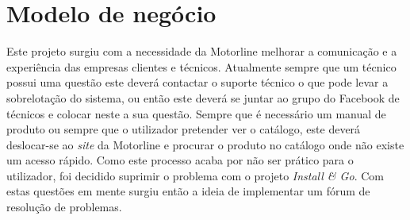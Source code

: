 \section{Modelo de negócio}

Este projeto surgiu com a necessidade da Motorline melhorar a comunicação e a experiência das 
empresas clientes e técnicos. Atualmente sempre que um técnico possui uma questão este deverá contactar o suporte técnico o que pode levar a sobrelotação do sistema, ou então este deverá se juntar ao grupo do Facebook de técnicos e colocar neste a sua questão. Sempre que é necessário um manual de produto ou sempre que o utilizador pretender ver o catálogo, este deverá deslocar-se ao \textit{site} da Motorline e procurar o produto no catálogo onde não existe um acesso rápido.
Como este processo acaba por não ser prático para o utilizador, foi decidido suprimir o problema com o projeto \textit{Install \& Go}. Com estas questões em mente surgiu então 
a ideia de implementar um fórum de resolução de problemas.
